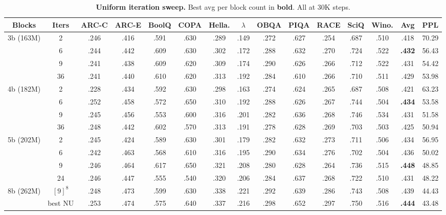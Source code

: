 \documentclass[oneside]{article}
\begin{document}
\begin{table}[t]
\centering
\caption{\textbf{Uniform iteration sweep.} Best avg per block count in \textbf{bold}. All at 30K steps.}
\label{tab:uniform}
\begin{adjustbox}{max width=\textwidth}
\begin{tabular}{c|c|ccccccccccc|c|c}
\toprule
\textbf{Blocks} & \textbf{Iters} & \textbf{ARC-C} & \textbf{ARC-E} & \textbf{BoolQ} & \textbf{COPA} & \textbf{Hella.} & \textbf{$\lambda$} & \textbf{OBQA} & \textbf{PIQA} & \textbf{RACE} & \textbf{SciQ} & \textbf{Wino.} & \textbf{Avg} & \textbf{PPL} \\
\midrule
\multirow{4}{*}{3b (163M)}
 & 2  & .246 & .416 & .591 & .630 & .289 & .149 & .272 & .627 & .254 & .687 & .510 & .418 & 70.29 \\
 & 6  & .244 & .442 & .609 & .630 & .302 & .172 & .288 & .632 & .270 & .724 & .522 & \textbf{.432} & 56.43 \\
 & 9  & .241 & .438 & .609 & .620 & .309 & .174 & .290 & .626 & .266 & .712 & .522 & .431 & 54.42 \\
 & 36 & .241 & .440 & .610 & .620 & .313 & .192 & .284 & .610 & .266 & .710 & .511 & .429 & 53.98 \\
\midrule
\multirow{4}{*}{4b (182M)}
 & 2  & .228 & .434 & .592 & .630 & .298 & .163 & .274 & .624 & .265 & .687 & .508 & .421 & 63.23 \\
 & 6  & .252 & .458 & .572 & .650 & .310 & .192 & .288 & .626 & .267 & .744 & .504 & \textbf{.434} & 53.58 \\
 & 9  & .245 & .456 & .553 & .600 & .316 & .201 & .282 & .636 & .268 & .746 & .534 & .431 & 51.58 \\
 & 36 & .248 & .442 & .602 & .570 & .313 & .191 & .278 & .628 & .269 & .703 & .503 & .425 & 50.94 \\
\midrule
\multirow{4}{*}{5b (202M)}
 & 2  & .245 & .424 & .589 & .630 & .301 & .179 & .282 & .632 & .273 & .711 & .506 & .434 & 56.95 \\
 & 6  & .242 & .463 & .568 & .610 & .316 & .195 & .290 & .634 & .276 & .702 & .504 & .436 & 50.02 \\
 & 9  & .246 & .464 & .617 & .650 & .321 & .208 & .280 & .628 & .264 & .736 & .515 & \textbf{.448} & 48.85 \\
 & 24 & .246 & .447 & .555 & .540 & .320 & .206 & .284 & .637 & .268 & .722 & .510 & .431 & 48.22 \\
\midrule
\multirow{2}{*}{8b (262M)}
 & $[9]^8$ & .248 & .473 & .599 & .630 & .338 & .221 & .292 & .639 & .286 & .743 & .508 & .439 & 44.43 \\
 & best NU & .253 & .474 & .575 & .640 & .337 & .216 & .298 & .652 & .297 & .750 & .516 & \textbf{.444} & 43.48 \\
\bottomrule
\end{tabular}
\end{adjustbox}
\end{table}
\end{document}
